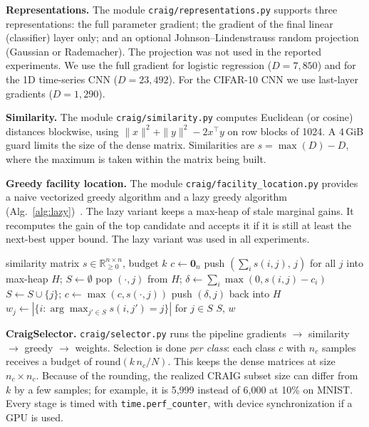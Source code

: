 \documentclass[conference]{IEEEtran}
\begin{document}
\textbf{Representations.} The module \texttt{craig/\allowbreak representations.py} supports three representations: the full parameter gradient; the gradient of the final linear (classifier) layer only; and an optional Johnson--Lindenstrauss random projection (Gaussian or Rademacher). The projection was not used in the reported experiments. We use the full gradient for logistic regression ($D=7{,}850$) and for the 1D time-series CNN ($D=23{,}492$). For the CIFAR-10 CNN we use last-layer gradients ($D=1{,}290$).

\textbf{Similarity.} The module \texttt{craig/\allowbreak similarity.py} computes Euclidean (or cosine) distances blockwise, using $\|x\|^2+\|y\|^2-2x^\top y$ on row blocks of 1024. A 4\,GiB guard limits the size of the dense matrix. Similarities are $s=\max(D)-D$, where the maximum is taken within the matrix being built.

\textbf{Greedy facility location.} The module \texttt{craig/\allowbreak facility\_\allowbreak location.py} provides a naive vectorized greedy algorithm and a lazy greedy algorithm (Alg.~\ref{alg:lazy})~\cite{minoux1978accelerated}. The lazy variant keeps a max-heap of stale marginal gains. It recomputes the gain of the top candidate and accepts it if it is still at least the next-best upper bound. The lazy variant was used in all experiments.

\begin{algorithm}[t]
\caption{Lazy greedy facility location (per class)}
\label{alg:lazy}
\begin{algorithmic}[1]
\REQUIRE similarity matrix $s\in\mathbb{R}_{\ge0}^{n\times n}$, budget $k$
\STATE $c\leftarrow \mathbf{0}_n$ 
\STATE push $(\sum_i s(i,j),\,j)$ for all $j$ into max-heap $H$; $S\leftarrow\emptyset$
  \STATE pop $(\cdot,j)$ from $H$; $\delta\leftarrow\sum_i\max(0,s(i,j)-c_i)$
    \STATE $S\leftarrow S\cup\{j\}$; $c\leftarrow\max(c,s(\cdot,j))$
  \ELSE
    \STATE push $(\delta,j)$ back into $H$
  \ENDIF
\ENDWHILE
\STATE $w_j\leftarrow|\{i:\arg\max_{j'\in S}s(i,j')=j\}|$ for $j\in S$
\RETURN $S$, $w$
\end{algorithmic}
\end{algorithm}

\textbf{CraigSelector.} \texttt{craig/\allowbreak selector.py} runs the pipeline gradients $\rightarrow$ similarity $\rightarrow$ greedy $\rightarrow$ weights. Selection is done \emph{per class}: each class $c$ with $n_c$ samples receives a budget of $\mathrm{round}(k\,n_c/N)$. This keeps the dense matrices at size $n_c\times n_c$. Because of the rounding, the realized CRAIG subset size can differ from $k$ by a few samples; for example, it is 5,999 instead of 6,000 at 10\% on MNIST. Every stage is timed with \texttt{time.perf\_counter}, with device synchronization if a GPU is used.
\end{document}
